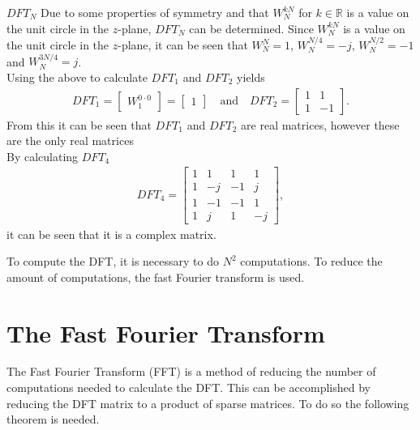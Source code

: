 \begin{example}{$DFT_N$}
    Due to some properties of symmetry and that $W_N^{kN}$ for $k\in \mathbb{R}$ is a value on the unit circle in the $z$-plane, $DFT_N$ can be determined.
    Since $W_N^{kN}$ is a value on the unit circle in the $z$-plane, it can be seen that $W_N^{N}=1$, $W_N^{N/4}=-j$, $W_N^{N/2}=-1$ and $W_N^{3N/4}=j$.\\
    Using the above to calculate $DFT_1$ and $DFT_2$ yields 
    \begin{align*}
     DFT_1 = \begin{bmatrix}
     W_1^{0\cdot0}
     \end{bmatrix}
     =
     \begin{bmatrix}
     1
     \end{bmatrix}\quad \text{and}\quad      DFT_2 =  
     \begin{bmatrix}
     1 & 1\\
     1 & -1
     \end{bmatrix}.
    \end{align*}
    From this it can be seen that $DFT_1$ and $DFT_2$ are real matrices, however these are the only real matrices\\
    By calculating $DFT_4$
    \begin{align*}
     DFT_4 = 
     \begin{bmatrix}
     1 & 1 & 1 & 1\\
     1 & -j & -1 & j\\
     1 & -1 & -1 & 1\\
     1 & j & 1 & -j
     \end{bmatrix},
    \end{align*}
    it can be seen that it is a complex matrix.
\end{example}
To compute the DFT, it is necessary to do $N^2$ computations. To reduce the amount of computations, the fast Fourier transform is used.
\section{The Fast Fourier Transform}
The Fast Fourier Transform (FFT) is a method of reducing the number of computations needed to calculate the DFT. This can be accomplished by reducing the DFT matrix to a product of sparse matrices. 
To do so the following theorem is needed.

